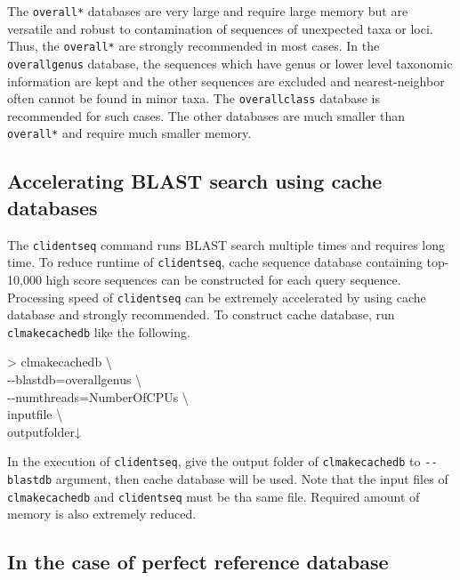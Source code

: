 \documentclass[titlepage,10pt,a4paper,english]{jsbook}
\newenvironment{cmd}{\begin{oframed}\raggedright\ttfamily\footnotesize\setlength{\baselineskip}{1.4em}}{\end{oframed}\vspace{-1em}}
\begin{document}
The \texttt{overall{\textunderscore}*} databases are very large and require large memory but are versatile and robust to contamination of sequences of unexpected taxa or loci.
Thus, the \texttt{overall{\textunderscore}*} are strongly recommended in most cases.
In the \texttt{overall{\textunderscore}genus} database, the sequences which have genus or lower level taxonomic information are kept and the other sequences are excluded and nearest-neighbor often cannot be found in minor taxa.
The \texttt{overall{\textunderscore}class} database is recommended for such cases.
The other databases are much smaller than \texttt{overall{\textunderscore}*} and require much smaller memory.

\subsection{Accelerating BLAST search using cache databases}

The \texttt{clidentseq} command runs BLAST search multiple times and requires long time.
To reduce runtime of \texttt{clidentseq}, cache sequence database containing top-10,000 high score sequences can be constructed for each query sequence.
Processing speed of \texttt{clidentseq} can be extremely accelerated by using cache database and strongly recommended.
To construct cache database, run \texttt{clmakecachedb} like the following.
\begin{cmd}
{\textgreater} clmakecachedb {\textbackslash}\\
{-}{-}blastdb=overall{\textunderscore}genus {\textbackslash}\\
{-}{-}numthreads=NumberOfCPUs {\textbackslash}\\
inputfile {\textbackslash}\\
outputfolder↓
\end{cmd}
In the execution of \texttt{clidentseq}, give the output folder of \texttt{clmakecachedb} to \texttt{{-}{-}blastdb} argument, then cache database will be used.
Note that the input files of \texttt{clmakecachedb} and \texttt{clidentseq} must be tha same file.
Required amount of memory is also extremely reduced.

\subsection{In the case of perfect reference database}\label{subsection:completereferencedatabase}
\end{document}
